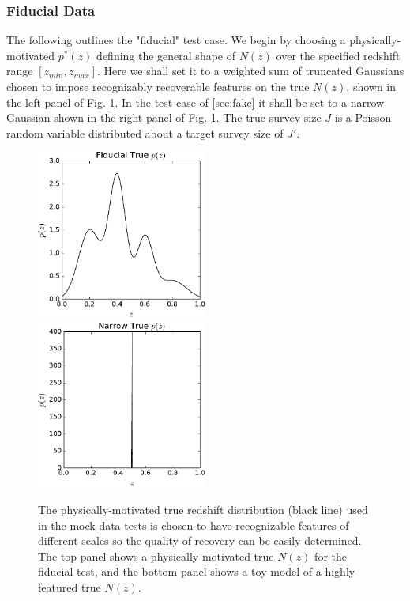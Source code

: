 \documentclass[preprint]{aastex}
\begin{document}
\subsubsection{Fiducial Data}
\label{sec:mock}

The following outlines the "fiducial" test case.  We begin by choosing a 
physically-motivated $p^{*}(z)$ defining the general shape of $N(z)$ over the 
specified redshift range $[z_{min},z_{max}]$.  Here we shall set it to a 
weighted sum of truncated Gaussians chosen to impose recognizably recoverable 
features on the true $N(z)$, shown in the left panel of Fig. \ref{fig:physpz}.  
In the test case of \ref{sec:fake} it shall be set to a narrow Gaussian shown 
in the right panel of Fig. \ref{fig:physpz}.  The true survey size $J$ is a 
Poisson random variable distributed about a target survey size of $J'$.

\begin{figure}
\includegraphics[width=0.5\textwidth]{figs/null/physPz.pdf}\\
\includegraphics[width=0.5\textwidth]{figs/delt/physPz.pdf}
\caption{The physically-motivated true redshift distribution (black line) used 
in the mock data tests is chosen to have recognizable features of different 
scales so the quality of recovery can be easily determined.  The top panel 
shows a physically motivated true $N(z)$ for the fiducial test, and the bottom 
panel shows a toy model of a highly featured true $N(z)$.}
\label{fig:physpz}
\end{figure}
\end{document}
